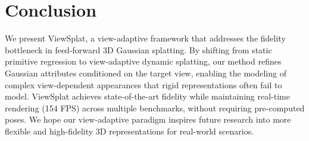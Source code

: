 \documentclass[runningheads]{llncs}
\begin{document}


\vspace{-0.4cm}
\section{Conclusion}
 We present ViewSplat, a view-adaptive framework that addresses the fidelity bottleneck in feed-forward 3D Gaussian splatting. By shifting from static primitive regression to view-adaptive dynamic splatting, our method refines Gaussian attributes conditioned on the target view, enabling the modeling of complex view-dependent appearances that rigid representations often fail to model. ViewSplat achieves state-of-the-art fidelity while maintaining real-time rendering (154 FPS) across multiple benchmarks, without requiring pre-computed poses.
 We hope our view-adaptive paradigm inspires future research into more flexible and high-fidelity 3D representations for real-world scenarios.
 
\end{document}

